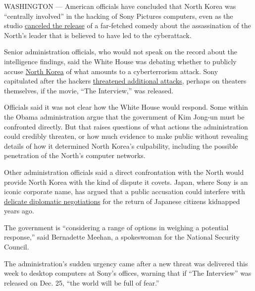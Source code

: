 WASHINGTON --- American officials have concluded that North Korea was
``centrally involved'' in the hacking of Sony Pictures computers, even
as the studio
\href{http://www.nytimes3xbfgragh.onion/2014/12/18/business/sony-the-interview-threats.html?_r=0}{canceled
the release} of a far-fetched comedy about the assassination of the
North's leader that is believed to have led to the cyberattack.

Senior administration officials, who would not speak on the record about
the intelligence findings, said the White House was debating whether to
publicly accuse
\href{http://topics.nytimes3xbfgragh.onion/top/news/international/countriesandterritories/northkorea/index.html?inline=nyt-geo}{North
Korea} of what amounts to a cyberterrorism attack. Sony capitulated
after the hackers
\href{http://www.nytimes3xbfgragh.onion/2014/12/17/business/media/sony-weighs-terrorism-threat-against-opening-of-the-interview.html}{threatened
additional attacks}, perhaps on theaters themselves, if the movie, ``The
Interview,'' was released.

Officials said it was not clear how the White House would respond. Some
within the Obama administration argue that the government of Kim Jong-un
must be confronted directly. But that raises questions of what actions
the administration could credibly threaten, or how much evidence to make
public without revealing details of how it determined North Korea's
culpability, including the possible penetration of the North's computer
networks.

Other administration officials said a direct confrontation with the
North would provide North Korea with the kind of dispute it covets.
Japan, where Sony is an iconic corporate name, has argued that a public
accusation could interfere with
\href{http://www.nytimes3xbfgragh.onion/2014/05/30/world/asia/north-korea-agrees-to-investigate-fate-of-japanese-abducted-decades-ago.html?module=Search\&mabReward=relbias\%3As\%2C\%7B\%221\%22\%3A\%22RI\%3A8\%22\%7D}{delicate
diplomatic negotiations} for the return of Japanese citizens kidnapped
years ago.

The government is ``considering a range of options in weighing a
potential response,'' said Bernadette Meehan, a spokeswoman for the
National Security Council.

The administration's sudden urgency came after a new threat was
delivered this week to desktop computers at Sony's offices, warning that
if ``The Interview'' was released on Dec. 25, ``the world will be full
of fear.''


